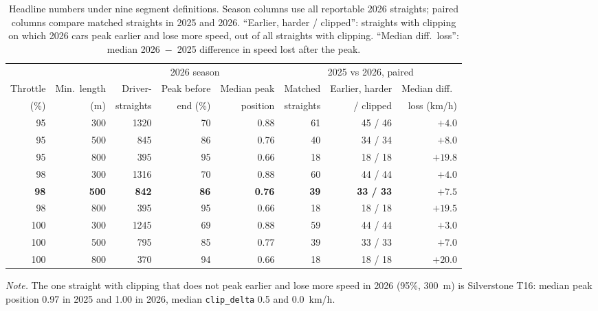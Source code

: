 \documentclass[11pt,a4paper]{article}
\newcommand{\var}[1]{\texttt{#1}}
\begin{document}
\begin{table}[!htbp]
  \centering
  \caption{Headline numbers under nine segment definitions. Season columns use all reportable 2026 straights; paired columns compare matched straights in 2025 and 2026. ``Earlier, harder / clipped'': straights with clipping on which 2026 cars peak earlier and lose more speed, out of all straights with clipping. ``Median diff.\ loss'': median 2026~$-$~2025 difference in speed lost after the peak.}
  \label{tab:sens}
  \footnotesize
  \setlength{\tabcolsep}{4pt}
  \begin{tabular}{rrrrrrrr}
    \toprule
     & & \multicolumn{3}{c}{2026 season} & \multicolumn{3}{c}{2025 vs 2026, paired} \\
    \cmidrule(lr){3-5}\cmidrule(lr){6-8}
    Throttle & Min.\ length & Driver- & Peak before & Median peak & Matched & Earlier, harder & Median diff.\ \\
    (\%) & (m) & straights & end (\%) & position & straights & / clipped & loss (km/h) \\
    \midrule
     95 & 300 & 1320 & 70 & 0.88 & 61 & 45 / 46 & $+4.0$ \\
     95 & 500 &  845 & 86 & 0.76 & 40 & 34 / 34 & $+8.0$ \\
     95 & 800 &  395 & 95 & 0.66 & 18 & 18 / 18 & $+19.8$ \\
     98 & 300 & 1316 & 70 & 0.88 & 60 & 44 / 44 & $+4.0$ \\
    \textbf{98} & \textbf{500} & \textbf{842} & \textbf{86} & \textbf{0.76} & \textbf{39} & \textbf{33 / 33} & $\mathbf{+7.5}$ \\
     98 & 800 &  395 & 95 & 0.66 & 18 & 18 / 18 & $+19.5$ \\
    100 & 300 & 1245 & 69 & 0.88 & 59 & 44 / 44 & $+3.0$ \\
    100 & 500 &  795 & 85 & 0.77 & 39 & 33 / 33 & $+7.0$ \\
    100 & 800 &  370 & 94 & 0.66 & 18 & 18 / 18 & $+20.0$ \\
    \bottomrule
  \end{tabular}

  \medskip
  \begin{minipage}{0.92\textwidth}
    \footnotesize\textit{Note.} The one straight with clipping that does not peak earlier and lose more speed in 2026 (95\%, 300~m) is Silverstone T16: median peak position 0.97 in 2025 and 1.00 in 2026, median \var{clip\_delta} 0.5 and 0.0~km/h.
  \end{minipage}
\end{table}

\FloatBarrier


\end{document}
